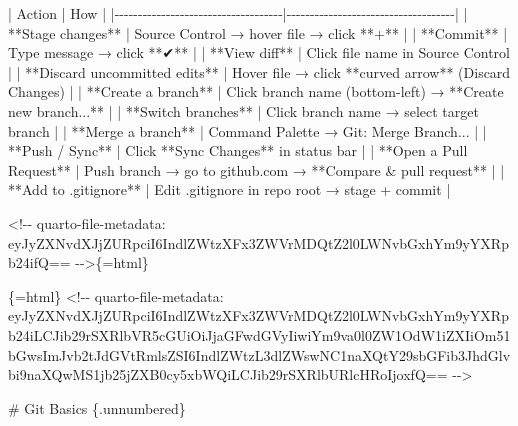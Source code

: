 \documentclass[
  letterpaper,
  DIV=11,
  numbers=noendperiod,
  oneside]{scrreprt}
\newenvironment{Shaded}{\begin{snugshade}}{\end{snugshade}}
\newcommand{\FunctionTok}[1]{\textcolor[rgb]{0.28,0.35,0.67}{#1}}
\newcommand{\InformationTok}[1]{\textcolor[rgb]{0.37,0.37,0.37}{#1}}
\newcommand{\NormalTok}[1]{\textcolor[rgb]{0.00,0.23,0.31}{#1}}
\newcommand{\PreprocessorTok}[1]{\textcolor[rgb]{0.68,0.00,0.00}{#1}}
\begin{document}
\begin{Shaded}
\begin{Highlighting}[numbers=left,,]
\PreprocessorTok{|}\NormalTok{ Action }\PreprocessorTok{|}\NormalTok{ How }\PreprocessorTok{|}
\PreprocessorTok{|{-}{-}{-}{-}{-}{-}{-}{-}{-}{-}{-}{-}{-}{-}{-}{-}{-}{-}{-}{-}{-}{-}{-}{-}{-}{-}{-}{-}{-}{-}{-}{-}{-}{-}{-}{-}|{-}{-}{-}{-}{-}{-}{-}{-}{-}{-}{-}{-}{-}{-}{-}{-}{-}{-}{-}{-}{-}{-}{-}{-}{-}{-}{-}{-}{-}{-}{-}{-}{-}{-}{-}{-}|}
\PreprocessorTok{|}\NormalTok{ **Stage changes** | Source Control → hover file → click **+** }\PreprocessorTok{|}
\PreprocessorTok{|}\NormalTok{ **Commit** | Type message → click **✔** }\PreprocessorTok{|}
\PreprocessorTok{|}\NormalTok{ **View diff** }\PreprocessorTok{|}\NormalTok{ Click file name in Source Control }\PreprocessorTok{|}
\PreprocessorTok{|}\NormalTok{ **Discard uncommitted edits** | Hover file → click **curved arrow** (Discard Changes) }\PreprocessorTok{|}
\PreprocessorTok{|}\NormalTok{ **Create a branch** | Click branch name (bottom{-}left) → **Create new branch...** }\PreprocessorTok{|}
\PreprocessorTok{|}\NormalTok{ **Switch branches** }\PreprocessorTok{|}\NormalTok{ Click branch name → select target branch }\PreprocessorTok{|}
\PreprocessorTok{|}\NormalTok{ **Merge a branch** }\PreprocessorTok{|}\NormalTok{ Command Palette → }\InformationTok{\textasciigrave{}Git: Merge Branch...\textasciigrave{}} \PreprocessorTok{|}
\PreprocessorTok{|}\NormalTok{ **Push / Sync** | Click **Sync Changes** in status bar }\PreprocessorTok{|}
\PreprocessorTok{|}\NormalTok{ **Open a Pull Request** | Push branch → go to github.com → **Compare \& pull request** }\PreprocessorTok{|}
\PreprocessorTok{|}\NormalTok{ **Add to \textasciigrave{}.gitignore\textasciigrave{}** }\PreprocessorTok{|}\NormalTok{ Edit }\InformationTok{\textasciigrave{}.gitignore\textasciigrave{}}\NormalTok{ in repo root → stage + commit }\PreprocessorTok{|}


\InformationTok{\textasciigrave{}\textless{}!{-}{-} quarto{-}file{-}metadata: eyJyZXNvdXJjZURpciI6IndlZWtzXFx3ZWVrMDQtZ2l0LWNvbGxhYm9yYXRpb24ifQ== {-}{-}\textgreater{}\textasciigrave{}}\NormalTok{\{=html\}}

\InformationTok{\textasciigrave{}\textasciigrave{}\textasciigrave{}\{=html\}}
\InformationTok{\textless{}!{-}{-} quarto{-}file{-}metadata: eyJyZXNvdXJjZURpciI6IndlZWtzXFx3ZWVrMDQtZ2l0LWNvbGxhYm9yYXRpb24iLCJib29rSXRlbVR5cGUiOiJjaGFwdGVyIiwiYm9va0l0ZW1OdW1iZXIiOm51bGwsImJvb2tJdGVtRmlsZSI6IndlZWtzL3dlZWswNC1naXQtY29sbGFib3JhdGlvbi9naXQwMS1jb25jZXB0cy5xbWQiLCJib29rSXRlbURlcHRoIjoxfQ== {-}{-}\textgreater{}}
\InformationTok{\textasciigrave{}\textasciigrave{}\textasciigrave{}}

\FunctionTok{\# Git Basics \{.unnumbered\}}



\end{Highlighting}
\end{Shaded}
\end{document}
